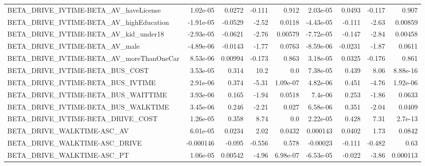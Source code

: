 \begin{tabular}{lrrrrrrrr}
BETA\_DRIVE\_IVTIME-BETA\_AV\_haveLicense              &    1.02e-05 &       0.0272 &   -0.111 &    0.912 &   2.03e-05 &      0.0493 &       -0.117 &         0.907 \\
BETA\_DRIVE\_IVTIME-BETA\_AV\_highEducation            &   -1.91e-05 &      -0.0529 &    -2.52 &   0.0118 &  -4.43e-05 &      -0.111 &        -2.63 &       0.00859 \\
BETA\_DRIVE\_IVTIME-BETA\_AV\_kid\_under18              &   -2.93e-05 &      -0.0621 &    -2.76 &  0.00579 &  -7.72e-05 &      -0.147 &        -2.84 &       0.00458 \\
BETA\_DRIVE\_IVTIME-BETA\_AV\_male                     &   -4.89e-06 &      -0.0143 &    -1.77 &   0.0763 &  -8.59e-06 &     -0.0231 &        -1.87 &        0.0611 \\
BETA\_DRIVE\_IVTIME-BETA\_AV\_moreThanOneCar           &    8.53e-06 &      0.00994 &   -0.173 &    0.863 &   3.18e-05 &      0.0325 &       -0.176 &         0.861 \\
BETA\_DRIVE\_IVTIME-BETA\_BUS\_COST                    &    3.53e-05 &        0.314 &     10.2 &      0.0 &   7.38e-05 &       0.439 &         8.06 &      8.88e-16 \\
BETA\_DRIVE\_IVTIME-BETA\_BUS\_IVTIME                  &    2.91e-06 &        0.374 &    -5.31 & 1.09e-07 &   4.82e-06 &       0.451 &        -4.76 &      1.92e-06 \\
BETA\_DRIVE\_IVTIME-BETA\_BUS\_WAITTIME                &    3.93e-06 &        0.165 &    -1.94 &   0.0518 &    7.4e-06 &       0.253 &        -1.86 &        0.0633 \\
BETA\_DRIVE\_IVTIME-BETA\_BUS\_WALKTIME                &    3.45e-06 &        0.246 &    -2.21 &    0.027 &   6.58e-06 &       0.351 &        -2.04 &        0.0409 \\
BETA\_DRIVE\_IVTIME-BETA\_DRIVE\_COST                  &    1.26e-05 &        0.358 &     8.74 &      0.0 &   2.22e-05 &       0.428 &         7.31 &       2.7e-13 \\
BETA\_DRIVE\_WALKTIME-ASC\_AV                         &    6.01e-05 &       0.0234 &     2.02 &   0.0432 &   0.000143 &      0.0402 &         1.73 &        0.0842 \\
BETA\_DRIVE\_WALKTIME-ASC\_DRIVE                      &   -0.000146 &       -0.095 &   -0.556 &    0.578 &   -0.00023 &      -0.111 &       -0.482 &          0.63 \\
BETA\_DRIVE\_WALKTIME-ASC\_PT                         &    1.06e-05 &      0.00542 &    -4.96 & 6.98e-07 &  -6.53e-05 &      -0.022 &        -3.86 &      0.000113 \\

\end{tabular}

